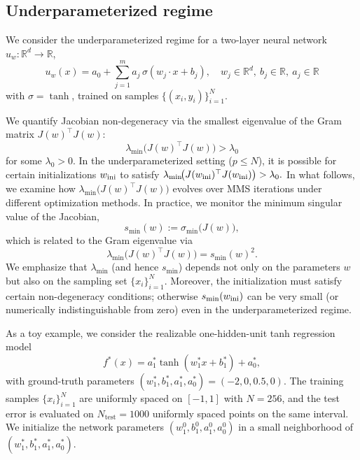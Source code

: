 \documentclass[twoside,11pt]{article}
\begin{document}
\subsection{Underparameterized regime}
We consider the underparameterized regime for a two-layer neural network $u_w:\mathbb{R}^d \to\mathbb{R}$,
\begin{equation}
u_{w}(x) = a_0 + \sum_{j=1}^m a_j \,\sigma(w_j \cdot x + b_j), \quad w_j \in \mathbb{R}^d,~b_j \in \mathbb{R},~a_j \in \mathbb{R}
\end{equation}
with $\sigma=\tanh$, trained on samples $\{(x_i,y_i)\}_{i=1}^N$.

We quantify Jacobian non-degeneracy via the smallest eigenvalue of the Gram matrix $J(w)^{\top}J(w)$:
\begin{equation}
\lambda_{\min}\!\big(J(w)^{\top}J(w)\big) > \lambda_0
\end{equation}
for some $\lambda_0>0$. In the underparameterized setting ($p\le N$), it is possible for certain initializations $w_{\rm ini}$ to satisfy $\lambda_{\min}\!\big(J(w_{\rm ini})^{\top}J(w_{\rm ini})\big) > \lambda_0.$
In what follows, we examine how $\lambda_{\min}\!\big(J(w)^{\top}J(w)\big)$ evolves over MMS iterations under different optimization methods. In practice, we monitor the minimum singular value of the Jacobian,
\begin{equation}
s_{\min}(w) := \sigma_{\min}\!\big(J(w)\big),
\end{equation}
which is related to the Gram eigenvalue via
\begin{equation}
\lambda_{\min}\!\big(J(w)^{\top}J(w)\big) = s_{\min}(w)^2.
\end{equation}
We emphasize that $\lambda_{\min}$ (and hence $s_{\min}$) depends not only on the parameters $w$ but also on the sampling set $\{x_i\}_{i=1}^N$. Moreover, the initialization must satisfy certain non-degeneracy conditions; otherwise $s_{\min}(w_{\rm ini})$ can be very small (or numerically indistinguishable from zero) even in the underparameterized regime.

\iffalse
As a toy example, we consider the realizable one-hidden-unit tanh regression model
\begin{equation}\label{eq:tanh}
f^*(x) = a_1^* \tanh (w_1^* x + b_1^*) + a_0^*,
\end{equation}
with ground-truth parameters $(w_1^*, b_1^*, a_1^*, a_0^*) = (-2, 0, 0.5, 0)$. 
The training samples $\{x_i\}_{i=1}^N$ are uniformly spaced on $[-1,1]$ with $N=256$, and the test error is evaluated on $N_{\mathrm{test}}=1000$ uniformly spaced points on the same interval. 
We initialize the network parameters $(w_1^0,b_1^0,a_1^0,a_0^0)$ in a small neighborhood of $(w_1^*,b_1^*,a_1^*,a_0^*)$.
\end{document}

